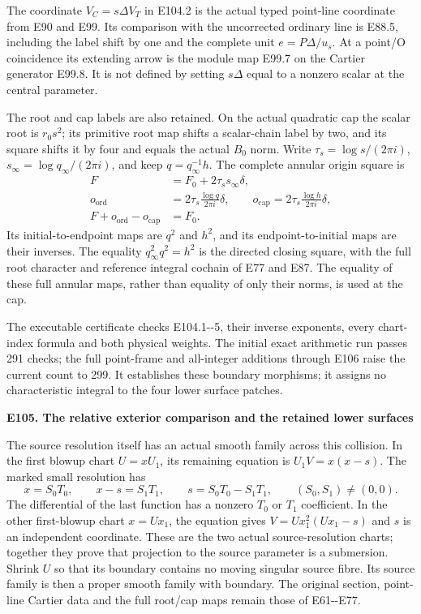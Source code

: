 The coordinate \(V_C=s\Delta V_T\) in E104.2 is the actual typed point-line coordinate from E90 and E99. Its comparison with the uncorrected ordinary line is E88.5, including the label shift by one and the complete unit \(e=P\Delta/u_s\). At a point/O coincidence its extending arrow is the module map E99.7 on the Cartier generator E99.8. It is not defined by setting \(s\Delta\) equal to a nonzero scalar at the central parameter.

The root and cap labels are also retained. On the actual quadratic cap the scalar root is \(r_0s^2\); its primitive root map shifts a scalar-chain label by two, and its square shifts it by four and equals the actual \(B_0\) norm. Write \(\tau_s=\log s/(2\pi i)\), \(s_\infty=\log q_\infty/(2\pi i)\), and keep \(q=q_\infty^{-1}h\). The complete annular origin square is
\[
 \begin{aligned}
 F&=F_0+2\tau_s s_\infty\delta,\\
 o_{\mathrm{ord}}&=2\tau_s\frac{\log q}{2\pi i}\delta,
 \qquad
 o_{\mathrm{cap}}=2\tau_s\frac{\log h}{2\pi i}\delta,\\
                  F+o_{\mathrm{ord}}-o_{\mathrm{cap}}&=F_0.
 \end{aligned}
 \tag{E104.5}
\]
Its initial-to-endpoint maps are \(q^2\) and \(h^2\), and its endpoint-to-initial maps are their inverses. The equality \(q_\infty^2q^2=h^2\) is the directed closing square, with the full root character and reference integral cochain of E77 and E87. The equality of these full annular maps, rather than equality of only their norms, is used at the cap.

The executable certificate  checks E104.1-\/-5, their inverse exponents, every chart-index formula and both physical weights. The initial exact arithmetic run passes 291 checks; the full point-frame and all-integer additions through E106 raise the current count to 299. It establishes these boundary morphisms; it assigns no characteristic integral to the four lower surface patches.

\par

\medskip\noindent\textbf{E105. The relative exterior comparison and the retained lower surfaces}

\par\nobreak

The source resolution itself has an actual smooth family across this collision. In the first blowup chart \(U=xU_1\), its remaining equation is \(U_1V=x(x-s)\). The marked small resolution has
\[
 x=S_0T_0,\qquad x-s=S_1T_1,
 \qquad s=S_0T_0-S_1T_1,
 \qquad (S_0,S_1)\ne(0,0).
 \tag{E105.1}
\]
The differential of the last function has a nonzero \(T_0\) or \(T_1\) coefficient. In the other first-blowup chart \(x=Ux_1\), the equation gives \(V=Ux_1^2(Ux_1-s)\) and \(s\) is an independent coordinate. These are the two actual source-resolution charts; together they prove that projection to the source parameter is a submersion. Shrink \(U\) so that its boundary contains no moving singular source fibre. Its source family is then a proper smooth family with boundary. The original section, point-line Cartier data and the full root/cap maps remain those of E61-\/-E77.


